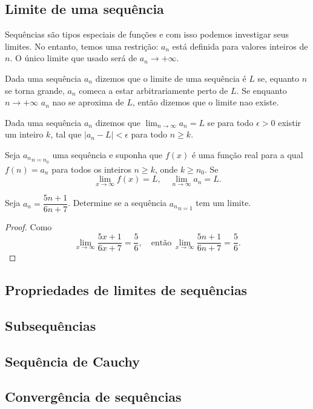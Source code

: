    \subsection{Limite de uma sequência}
      Sequências são tipos especiais de funções e com isso podemos investigar seus
      limites. No entanto, temos uma restrição: ${a_{n}}$ está definida para
      valores inteiros de $n$. O único limite que usado será de $a_{n} \to
      +\infty.$
      \begin{definition}[Intuitiva]
         Dada uma sequência ${a_{n}}$ dizemos que o limite de uma sequência é
         $L$ se, equanto $n$ se torna grande, $a_{n}$ comeca a estar
         arbitrariamente perto de $L$. Se enquanto $n \to +\infty$ $a_{n}$ nao
         se aproxima de $L$, então dizemos que o limite nao existe.
      \end{definition}
      \begin{definition}
         Dada uma sequência ${a_{n}}$ dizemos que $\lim_{n\to\infty} a_{n} = L$
         se para todo $\epsilon > 0$ existir um inteiro $k$, tal que $| a_{n} -
         L | < \epsilon$ para todo $n \geq k$.
      \end{definition}
      \begin{theorem}
         Seja ${a_{n}}_{n=n_{0}}$ uma sequência e suponha que $f(x)$ é uma
         função real para a qual $f(n) = a_{n}$ para todos os inteiros $n \geq k$,
         onde $k \geq n_{0}$. Se $$\lim_{x\to\infty} f(x) = L,\quad
         \lim_{n\to\infty} a_{n} = L.$$
      \end{theorem}
      \begin{exmp}
         Seja $a_{n} = \dfrac{5n+1}{6n+7}$. Determine se a sequência
         ${a_{n}}_{n=1}$ tem um limite.
         \begin{proof}
            Como $$\lim_{x\to\infty} \dfrac{5x+1}{6x+7} = \dfrac{5}{6},\quad \textrm{então}\ \lim_{x\to\infty} \dfrac{5n+1}{6n+7} = \dfrac{5}{6}.$$
         \end{proof}
      \end{exmp}
   \subsection{Propriedades de limites de sequências}
   \subsection{Subsequências}
   \subsection{Sequência de Cauchy}

   \subsection{Convergência de sequências}
